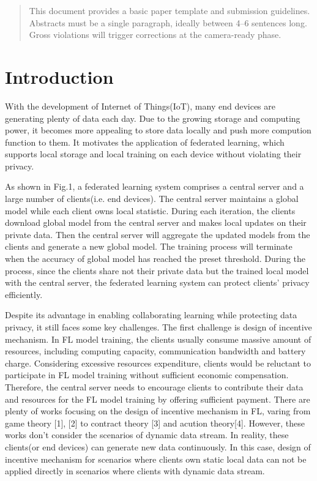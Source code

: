 \documentclass{article}
\theoremstyle{plain}
\theoremstyle{definition}
\theoremstyle{remark}
\begin{document}
\printAffiliationsAndNotice{\icmlEqualContribution} %

\begin{abstract}
This document provides a basic paper template and submission guidelines.
Abstracts must be a single paragraph, ideally between 4--6 sentences long.
Gross violations will trigger corrections at the camera-ready phase.
\end{abstract}


\section{Introduction}
\label{Introduction}
With the development of Internet of Things(IoT), many end devices are generating plenty of data each day.
Due to the growing storage and computing power, it becomes more appealing to store data locally and push more compution function to them.
It motivates the application of federated learning, which supports local storage and local training on each device without violating their privacy.

As shown in Fig.1, a federated learning system comprises a central server and a large number of clients(i.e. end devices).
The central server maintains a global model while each client owns local statistic.
During each iteration, the clients download global model from the central server and makes local updates on their private data. Then the central server will aggregate the updated models from the clients and generate a new global model.
The training process will terminate when the accuracy of global model has reached the preset threshold.
During the process, since the clients share not their private data but the trained local model with the central server, the federated learning system can protect clients' privacy efficiently.

Despite its advantage in enabling collaborating learning while protecting data privacy, it still faces some key challenges.
The first challenge is design of incentive mechanism.
In FL model training, the clients usually consume massive amount of resources, including computing capacity, communication bandwidth and battery charge.
Considering excessive resources expenditure, clients would be reluctant to participate in FL model training without sufficient economic compensation.
Therefore, the central server needs to encourage clients to contribute their data and resources for the FL model training by offering sufficient payment. 
There are plenty of works focusing on the design of incentive mechanism in FL, varing from game theory [1], [2] to contract theory [3] and acution theory[4].
However, these works don't consider the scenarios of dynamic data stream. In reality, these clients(or end devices) can generate new data continuously.
In this case, design of incentive mechanism for scenarios where clients own static local data can not be applied directly in scenarios where clients with dynamic data stream.
\end{document}
